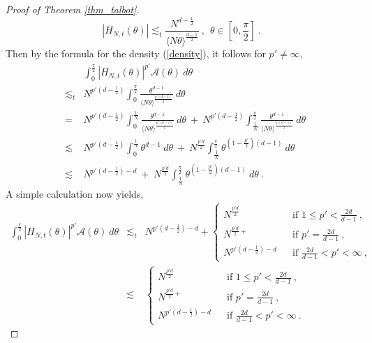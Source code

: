 \documentclass[12pt]{amsart}
\theoremstyle{definition}
\numberwithin{equation}{section}
\begin{document}
\begin{proof}[Proof of Theorem \ref{thm_talbot}]
\begin{equation}
\left|H_{N,t}(\theta)\right| \lesssim_t \frac{N^{d-\frac{1}{2}}}{\langle N\theta\rangle^{\frac{d-1}{2}}}\:,\:\:\theta \in \left[0,\frac{\pi}{2}\right]\:.
\end{equation}
Then by the formula for the density (\ref{density}), it follows for $p'\ne \infty$,
\begin{eqnarray*}
&&\int_0^{\frac{\pi}{2}} \left|H_{N,t}(\theta)\right|^{p'}\mathcal{A}(\theta)\:d\theta \\
&\lesssim_t & N^{p'\left(d-\frac{1}{2}\right)}\int_0^{\frac{\pi}{2}} \frac{\theta^{d-1}}{\langle N\theta\rangle^{\frac{p'(d-1)}{2}}}\:d\theta\\
&=& N^{p'\left(d-\frac{1}{2}\right)}\int_0^{\frac{1}{N}} \frac{\theta^{d-1}}{\langle N\theta\rangle^{\frac{p'(d-1)}{2}}}\:d\theta\:+\:N^{p'\left(d-\frac{1}{2}\right)}\int_{\frac{1}{N}}^{\frac{\pi}{2}} \frac{\theta^{d-1}}{\langle N\theta\rangle^{\frac{p'(d-1)}{2}}}\:d\theta\\
&\lesssim& N^{p'\left(d-\frac{1}{2}\right)}\int_0^{\frac{1}{N}} \theta^{d-1}\:d\theta\:+\:N^{\frac{p'd}{2}}\int_{\frac{1}{N}}^{\frac{\pi}{2}} \theta^{\left(1-\frac{p'}{2}\right)(d-1)}\:d\theta\\
&\lesssim& N^{p'\left(d-\frac{1}{2}\right)-d}\:+\:N^{\frac{p'd}{2}}\int_{\frac{1}{N}}^{\frac{\pi}{2}} \theta^{\left(1-\frac{p'}{2}\right)(d-1)}\:d\theta\:.
\end{eqnarray*}
A simple calculation now yields,
\begin{eqnarray} \label{thm_talbot_pf_eq8}
\int_0^{\frac{\pi}{2}} \left|H_{N,t}(\theta)\right|^{p'}\mathcal{A}(\theta)\:d\theta &\lesssim_t & N^{p'\left(d-\frac{1}{2}\right)-d} + \begin{cases}
      N^{\frac{p'd}{2}}\:\:&\text{ if } 1 \le p' < \frac{2d}{d-1}\:,\\
	 N^{\frac{p'd}{2}+}\:\:&\text{ if } p' = \frac{2d}{d-1}\:,\\
	 N^{p'\left(d-\frac{1}{2}\right)-d}\:\:&\text{ if } \frac{2d}{d-1} < p' <\infty\:,
	\end{cases}
\nonumber\\
&\lesssim & \begin{cases}
      N^{\frac{p'd}{2}}\:\:&\text{ if } 1 \le p' < \frac{2d}{d-1}\:,\\
	 N^{\frac{p'd}{2}+}\:\:&\text{ if } p' = \frac{2d}{d-1}\:,\\
	 N^{p'\left(d-\frac{1}{2}\right)-d}\:\:&\text{ if } \frac{2d}{d-1} < p' <\infty\:.
	\end{cases}
\end{eqnarray}


\end{proof}
\end{document}

